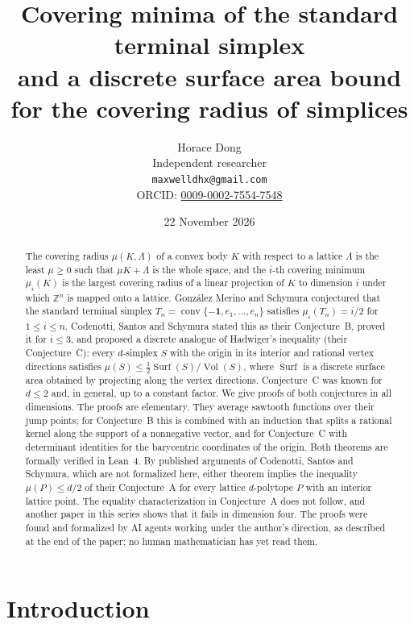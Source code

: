 \documentclass[11pt]{article}
\title{Covering minima of the standard terminal simplex\\ and a discrete surface area bound\\ for the covering radius of simplices}
\author{Horace Dong\\ \small Independent researcher\\
\small\texttt{maxwelldhx@gmail.com}\\
\small ORCID: \href{https://orcid.org/0009-0002-7554-7548}{0009-0002-7554-7548}}
\date{22 November 2026}
\theoremstyle{definition}
\theoremstyle{remark}
\newcommand{\Z}{\mathbb Z}
\newcommand{\one}{\mathbf 1}
\newcommand{\conv}{\operatorname{conv}}
\newcommand{\Vol}{\operatorname{Vol}}
\newcommand{\Surf}{\operatorname{Surf}}
\begin{document}
\maketitle

\begin{abstract}
The covering radius $\mu(K,\Lambda)$ of a convex body $K$ with respect to a
lattice $\Lambda$ is the least $\mu\ge0$ such that $\mu K+\Lambda$ is the whole
space, and the $i$-th covering minimum $\mu_i(K)$ is the largest covering
radius of a linear projection of $K$ to dimension $i$ under which $\Z^n$ is
mapped onto a lattice. González Merino and Schymura conjectured that the
standard terminal simplex $T_n=\conv\{-\one,e_1,\dots,e_n\}$ satisfies
$\mu_i(T_n)=i/2$ for $1\le i\le n$. Codenotti, Santos and Schymura stated this
as their Conjecture~B, proved it for $i\le3$, and proposed a discrete analogue
of Hadwiger's inequality (their Conjecture~C): every $d$-simplex $S$ with the
origin in its interior and rational vertex directions satisfies
$\mu(S)\le\frac12\Surf(S)/\Vol(S)$, where $\Surf$ is a discrete surface area
obtained by projecting along the vertex directions. Conjecture~C was known for
$d\le2$ and, in general, up to a constant factor. We give proofs of both
conjectures in all dimensions. The proofs are elementary. They average
sawtooth functions over their jump points; for Conjecture~B this is combined
with an induction that splits a rational kernel along the support of a
nonnegative vector, and for Conjecture~C with determinant identities for the
barycentric coordinates of the origin. Both theorems are formally verified in
Lean~4. By published arguments of Codenotti, Santos and Schymura, which are
not formalized here, either theorem implies the inequality $\mu(P)\le d/2$ of
their Conjecture~A for every lattice $d$-polytope $P$ with an interior lattice
point. The equality characterization in Conjecture~A does not follow, and
another paper in this series shows that it fails in dimension four. The proofs
were found and formalized by AI agents working under the author's direction,
as described at the end of the paper; no human mathematician has yet read
them.
\end{abstract}

\section{Introduction}
\end{document}
